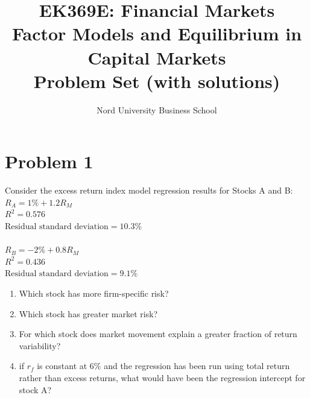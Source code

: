\documentclass[12]{article}
\title{EK369E: Financial Markets\\ Factor Models and Equilibrium in Capital Markets\\ Problem Set (with solutions)}
\author{Nord University Business School}
\date{}
\begin{document}
\maketitle

\color{black}
\section*{Problem 1}
Consider the excess return index model regression results for Stocks A and B:\\
$R_A = 1\% + 1.2R_M$\\
$R^2 = 0.576$\\
$ \text{Residual standard deviation} = 10.3\%$\\
\\
$R_B = -2\% + 0.8R_M$\\
$R^2 = 0.436$\\
$\text{Residual standard deviation} = 9.1\%$\\
\begin{enumerate}
    \item[a)] Which stock has more firm-specific risk?
    \item[b)] Which stock has greater market risk?
    \item[c)] For which stock does market movement explain a greater fraction of return variability?
    \item[d)] if $r_f$ is constant at 6\% and the regression has been run using total return rather than excess returns, what would have been the regression intercept for stock A?
\end{enumerate}

\color{blue}
\end{document}
